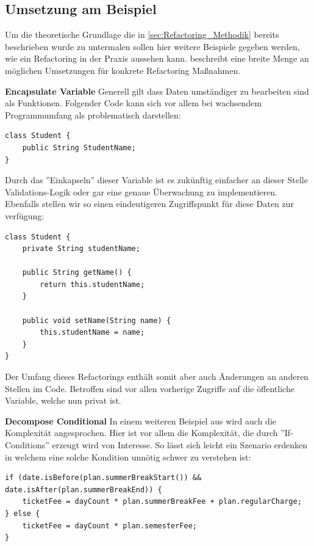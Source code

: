 \documentclass[acmtog]{acmart}
\begin{document}
\subsection{Umsetzung am Beispiel}

Um die theoretische Grundlage die in \ref{sec:Refactoring_Methodik} bereits beschrieben wurde zu untermalen sollen hier weitere Beispiele gegeben werden, wie ein Refactoring in der Praxis aussehen kann.
\cite{fowler2019refactoring} beschreibt eine breite Menge an möglichen Umsetzungen für konkrete Refactoring Maßnahmen.

\textbf{Encapsulate Variable}
Generell gilt dass Daten umständiger zu bearbeiten sind als Funktionen. Folgender Code kann sich vor allem bei wachsendem Programmumfang als problematisch darstellen:

\begin{lstlisting}[frame=single,breaklines=true]
class Student {
    public String StudentName;
}
\end{lstlisting}

Durch das ''Einkapseln'' dieser Variable ist es zukünftig einfacher an dieser Stelle Validations-Logik oder gar eine genaue Überwachung zu implementieren. Ebenfalls stellen wir so einen eindeutigeren Zugriffspunkt für diese Daten zur verfügung:

\begin{lstlisting}[frame=single,breaklines=true]
class Student {
    private String studentName;

    public String getName() {
        return this.studentName;
    }

    public void setName(String name) {
        this.studentName = name;
    }
}
\end{lstlisting}

Der Umfang dieses Refactorings enthält somit aber auch Änderungen an anderen Stellen im Code. Betroffen sind vor allen vorherige Zugriffe auf die öffentliche Variable, welche nun privat ist. \cite{fowler2019refactoring}

\textbf{Decompose Conditional}
In einem weiteren Beispiel aus \cite{fowler2019refactoring} wird auch die Komplexität angesprochen. Hier ist vor allem die Komplexität, die durch ''If-Conditions'' erzeugt wird von Interesse. So lässt sich leicht ein Szenario erdenken in welchem eine solche Kondition unnötig schwer zu verstehen ist:

\begin{lstlisting}[frame=single,breaklines=true]
if (date.isBefore(plan.summerBreakStart()) && date.isAfter(plan.summerBreakEnd)) {
    ticketFee = dayCount * plan.summerBreakFee + plan.regularCharge;
} else {
    ticketFee = dayCount * plan.semesterFee;
}
\end{lstlisting}
\end{document}
